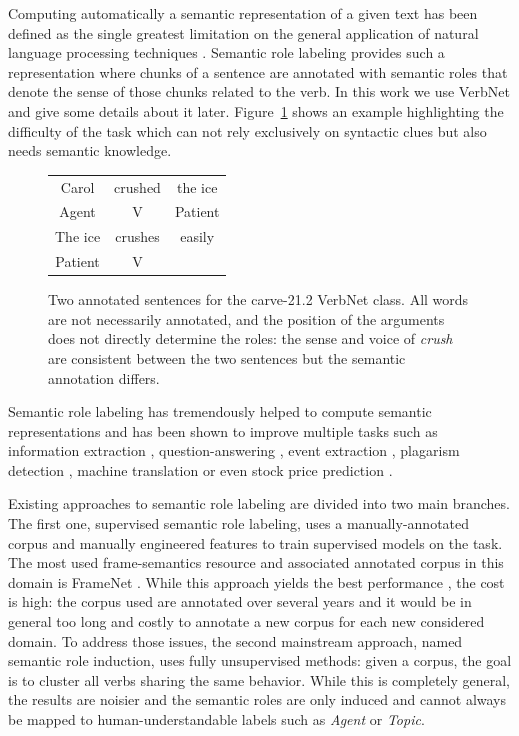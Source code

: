 Computing automatically a semantic representation of a given text has been
defined as the single greatest limitation on the general application of natural
language processing techniques \citep{dang1998investigating}. Semantic role
labeling provides such a representation where chunks of a sentence are
annotated with semantic roles that denote the sense of those chunks related to
the verb. In this work we use VerbNet \citep{kipperschuler2005verbnet} and give
some details about it later. Figure~\ref{fig:example_srl} shows an example
highlighting the difficulty of the task which can not rely exclusively on
syntactic clues but also needs semantic knowledge.

\begin{figure}[ht]
    \centering
    \begin{tabular}{ccc}
        \toprule
        Carol & crushed   & the ice \\
        Agent & V         & Patient \\
        \midrule
        The ice & crushes & easily  \\
        Patient & V       &         \\
        \bottomrule
    \end{tabular}
    \caption{\label{fig:example_srl}Two annotated sentences for the carve-21.2 VerbNet class. All words are not necessarily annotated, and the position of the arguments does not directly determine the roles: the sense and voice of \textit{crush} are consistent between the two sentences but the semantic annotation differs.}
\end{figure}

Semantic role labeling has tremendously helped to compute semantic
representations and has been shown to improve multiple tasks such as
information extraction \citep{surdeanu2003using}, question-answering
\citep{shen2007using}, event extraction \citep{exner2011using},
plagarism detection \citep{osman2012improved}, machine translation
\citep{bazrafshan2013semantic} or even stock price prediction
\citep{xie2013semantic}.

Existing approaches to semantic role labeling are divided into two main
branches. The first one, supervised semantic role labeling, uses a
manually-annotated corpus and manually engineered features to train supervised
models on the task. The most used frame-semantics resource and associated
annotated corpus in this domain is FrameNet \citep{baker1998berkeley}.
While this approach yields the best performance \citep{das2013frame}, the
cost is high: the corpus used are annotated over several years and it would be
in general too long and costly to annotate a new corpus for each new considered
domain. To address those issues, the second mainstream approach, named semantic
role induction, uses fully unsupervised methods: given a corpus, the goal is to
cluster all verbs sharing the same behavior. While this is completely general,
the results are noisier and the semantic roles are only induced and cannot
always be mapped to human-understandable labels such as \textit{Agent} or
\textit{Topic}.

